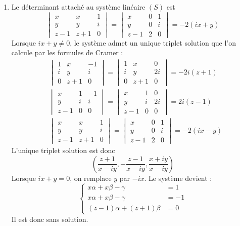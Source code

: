 \begin{enumerate}
 \item Le déterminant attaché au système linéaire $(S)$ est
\begin{displaymath}
 \begin{vmatrix}
  x   & x   & 1 \\
  y   & y   & i \\
  z-1 & z+1 & 0
 \end{vmatrix}=
 \begin{vmatrix}
  x   & 0   & 1 \\
  y   & 0   & i \\
  z-1 & 2 & 0
 \end{vmatrix}=
-2(ix+y)
\end{displaymath}
Lorsque $ix+y\neq 0$, le système admet un unique triplet solution que l'on calcule par les formules de Cramer :
\begin{align*}
&\begin{vmatrix}
 1 & x   & -1 \\
 i & y   & i  \\
 0 & z+1 & 0
\end{vmatrix}=
\begin{vmatrix}
 1 & x   & 0 \\
 i & y   & 2i  \\
 0 & z+1 & 0
\end{vmatrix} = -2i(z+1)
\\
&\begin{vmatrix}
 x   & 1   & -1 \\
 y   & i   & i  \\
 z-1 & 0   & 0
\end{vmatrix} =
\begin{vmatrix}
 x   & 1   & 0 \\
 y   & i   & 2i  \\
 z-1 & 0   & 0
\end{vmatrix} = 2i(z-1)
\\
&\begin{vmatrix}
 x   & x   & 1 \\
 y   & y   & i  \\
 z-1 & z+1 & 0
\end{vmatrix} = 
\begin{vmatrix}
 x   & 0 & 1 \\
 y   & 0 & i  \\
 z-1 & 2 & 0
\end{vmatrix} = -2(ix-y)
\end{align*}
L'unique triplet solution est donc
\begin{displaymath}
 \left(
\frac{z+1}{x-iy}, -\frac{z-1}{x-iy}, \frac{x+iy}{x-iy}\right) 
\end{displaymath}
Lorsque $ix+y=0$, on remplace $y$ par $-ix$. Le système devient :
\begin{displaymath}
 \left\lbrace 
\begin{aligned}
 x\alpha + x \beta - \gamma &= 1 \\
 x\alpha + x \beta - \gamma &= -1 \\
 (z-1)\alpha + (z+1)\beta &=0
\end{aligned}
\right. 
\end{displaymath}
Il est donc sans solution.


\end{enumerate}
